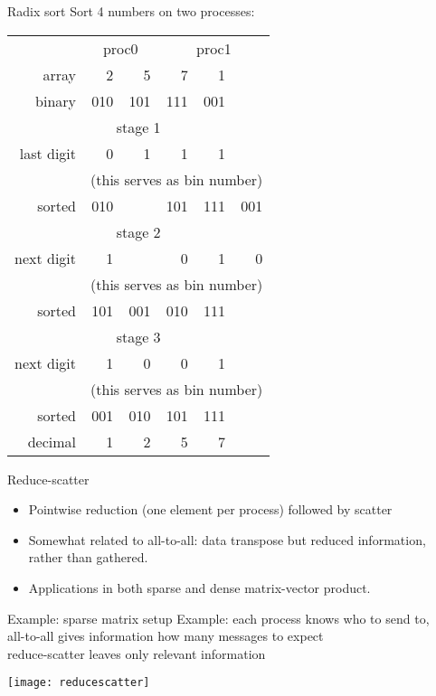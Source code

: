 \begin{numberedframe}{Radix sort}
  \scriptsize
  Sort 4 numbers on two processes:

  \begin{tabular}{|r|rr|rrr|}
    \hline
    & \multicolumn{2}{|c}{proc0}&\multicolumn{3}{|c|}{proc1}\\
    array     & 2&5&7&1&\\
    binary    & 010& 101& 111& 001&\\
    \hline
    \multicolumn{6}{|c|}{stage 1}\\
    \hline
    last digit&   0&   1&   1&   1&\\
    &\multicolumn{5}{|c|}{(this serves as bin number)}\\
    sorted    & 010&    & 101& 111& 001\\
    \multicolumn{6}{|c|}{stage 2}\\
    \hline
    next digit&  1 &    &  0 &  1 &  0\\
    &\multicolumn{5}{|c|}{(this serves as bin number)}\\
    sorted    & 101& 001& 010& 111&\\
    \multicolumn{6}{|c|}{stage 3}\\
    \hline
    next digit& 1  & 0  & 0  & 1&\\
    &\multicolumn{5}{|c|}{(this serves as bin number)}\\
    sorted    & 001& 010& 101& 111&\\
    decimal   & 1  & 2  & 5  & 7&\\
    \hline
  \end{tabular}
\end{numberedframe}

\begin{numberedframe}{Reduce-scatter}
  \begin{itemize}
  \item 
    Pointwise reduction (one element per process) followed by scatter
  \item 
    Somewhat related to all-to-all: data transpose but reduced
    information, rather than gathered.
  \item Applications in both sparse and dense matrix-vector product.
  \end{itemize}
\end{numberedframe}

\begin{numberedframe}{Example: sparse matrix setup}
  Example: each process knows who to send to, \\
  all-to-all gives information how many messages to expect\\
  reduce-scatter leaves only relevant information

  \texttt{[image: reducescatter]}
\end{numberedframe}

